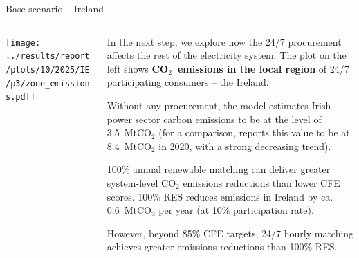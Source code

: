 \begin{frame}{Base scenario -- Ireland}

  {\footnotesize
  \vspace{0.1cm}
  
  \begin{columns}[T]
  \begin{column}{9cm}
  \centering
  
  \texttt{[image: ../results/report/plots/10/2025/IE/p3/zone\_emissions.pdf]}
  
  \end{column}
  \begin{column}{6cm}
  
  \vspace{0.1cm}
  In the next step, we explore how the 24/7 procurement affects the 
  rest of the electricity system. The plot on the left shows
  {\bf CO$_2$~emissions in the local region} of 24/7 participating 
  consumers -- the Ireland.
  
  \vspace{0.1cm}
  Without any procurement, the model estimates 
  Irish power sector carbon emissions to be at the level of 3.5~MtCO$_2$
  (for a comparison, 
  reports this value to be at 8.4~MtCO$_2$ in 2020, with a strong decreasing trend).

  \vspace{0.1cm}
  100\% annual renewable matching can deliver greater system-level CO$_2$ emissions
  reductions than lower CFE scores. 100\% RES reduces emissions in Ireland by 
  ca. 0.6~MtCO$_2$ per year (at 10\% participation rate).
  
  \vspace{0.1cm}
  However, beyond 85\% CFE targets, 24/7 hourly matching achieves
  \alert{greater emissions reductions} than 100\% RES.

  \end{column}
  \end{columns}
  }
\end{frame}


